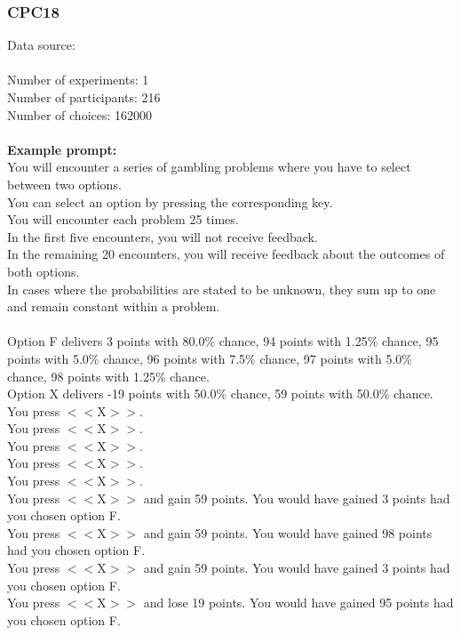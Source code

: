 \documentclass[pdflatex,sn-nature]{sn-jnl}%
\theoremstyle{thmstyleone}%
\theoremstyle{thmstyletwo}%
\theoremstyle{thmstylethree}%
\begin{document}
\subsubsection*{CPC18}
Data source: \cite{plonsky2018and} \\ $~$ \\
Number of experiments: 1 $~$\\ 
Number of participants: 216 $~$\\ 
Number of choices: 162000 $~$\\ 
 $~$\\ 
\textbf{Example prompt:}
 $~$\\ 
You will encounter a series of gambling problems where you have to select between two options. $~$\\ 
You can select an option by pressing the corresponding key. $~$\\ 
You will encounter each problem 25 times. $~$\\ 
In the first five encounters, you will not receive feedback. $~$\\ 
In the remaining 20 encounters, you will receive feedback about the outcomes of both options. $~$\\ 
In cases where the probabilities are stated to be unknown, they sum up to one and remain constant within a problem. $~$\\ 
 $~$\\ 
Option F delivers 3 points with 80.0\% chance, 94 points with 1.25\% chance, 95 points with 5.0\% chance, 96 points with 7.5\% chance, 97 points with 5.0\% chance, 98 points with 1.25\% chance. $~$\\ 
Option X delivers -19 points with 50.0\% chance, 59 points with 50.0\% chance. $~$\\ 
You press $<<$X$>>$. $~$\\ 
You press $<<$X$>>$. $~$\\ 
You press $<<$X$>>$. $~$\\ 
You press $<<$X$>>$. $~$\\ 
You press $<<$X$>>$. $~$\\ 
You press $<<$X$>>$ and gain 59 points. You would have gained 3 points had you chosen option F. $~$\\ 
You press $<<$X$>>$ and gain 59 points. You would have gained 98 points had you chosen option F. $~$\\ 
You press $<<$X$>>$ and gain 59 points. You would have gained 3 points had you chosen option F. $~$\\ 
You press $<<$X$>>$ and lose 19 points. You would have gained 95 points had you chosen option F. $~$\\ 
\end{document}
